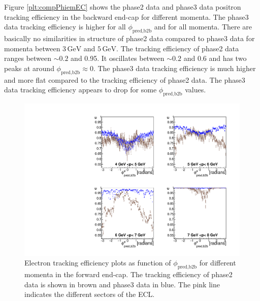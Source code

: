 \documentclass[a4paper,11pt,twosided,final,german,openbib,pdftex,listof=totoc,bibliography=totoc]{scrbook}
\begin{document}
Figure \ref{plt:compPhiemEC} shows the phase2 data and phase3 data positron tracking efficiency in the backward end-cap for different momenta.
The phase3 data tracking efficiency is higher for all $\phi_{\textrm{pred,b2b}}$ and for all momenta.
There are basically no similarities in structure of phase2 data compared to phase3 data for momenta between $3\,\textrm{GeV}$ and $5\,\textrm{GeV}$. The tracking efficiency of phase2 data ranges between $\sim 0.2$ and 0.95. It oscillates between $\sim 0.2$ and 0.6 and has two peaks at around $\phi_{\textrm{pred,b2b}} \approx 0$.
The phase3 data tracking efficiency is much higher and more flat compared to the tracking efficiency of phase2 data. The phase3 data tracking efficiency appears to drop for some $\phi_{\textrm{pred,b2b}}$ values.



\begin{figure}[!htbp]
	\centering
	\includegraphics[width=\textwidth]{Plots/comp/cMPhiemFC_Data.pdf}
	\caption[Momentum $\phi_{\textrm{pred,b2b}}$ Electron Efficiency Forward End-Cap Phase2 And Phase3 Data]{Electron tracking efficiency plots as function of $\phi_{\textrm{pred,b2b}}$ for different momenta in the forward end-cap. The tracking efficiency of phase2 data is shown in brown and phase3 data in blue. The pink line indicates the different sectors of the ECL.}
	\label{plt:compPhiemFC}
\end{figure}
\end{document}
